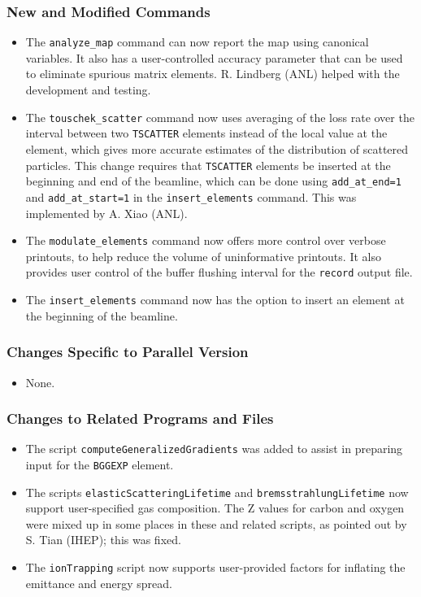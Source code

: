 \documentclass[11pt]{article}
\begin{document}
\subsubsection{New and Modified Commands}
\begin{itemize}
\item The \verb|analyze_map| command can now report the map using canonical variables. It also has a user-controlled accuracy
  parameter that can be used to eliminate spurious matrix elements. R. Lindberg (ANL) helped with the development and testing.
\item The  \verb|touschek_scatter| command  now uses averaging of the loss rate over the interval between two \verb|TSCATTER| elements
  instead of the local value at the element, which gives more accurate estimates of the distribution of scattered particles.
  This change requires that \verb|TSCATTER| elements be inserted at the beginning and end of the beamline, which can be
  done using \verb|add_at_end=1| and \verb|add_at_start=1| in the \verb|insert_elements| command.
  This was implemented by A. Xiao (ANL).
\item The \verb|modulate_elements| command now offers more control over verbose printouts, to help reduce the volume of
  uninformative printouts. It also provides user control of the buffer flushing interval for the \verb|record| output file.
\item The \verb|insert_elements| command now has the option to insert an element at the beginning of the beamline.
\end{itemize}

\subsubsection{Changes Specific to Parallel Version}

\begin{itemize}
\item None.
\end{itemize}

\subsubsection{Changes to Related Programs and Files}

\begin{itemize}
\item The script \verb|computeGeneralizedGradients| was added to assist in preparing input for the \verb|BGGEXP| element.
\item The scripts \verb|elasticScatteringLifetime| and \verb|bremsstrahlungLifetime| now support user-specified gas composition.
The Z values for carbon and oxygen were mixed up in some places in these and related scripts, as pointed out by S. Tian (IHEP);
this was fixed.
\item The \verb|ionTrapping| script now supports user-provided factors for inflating the emittance and energy spread.
\end{itemize}
\end{document}
